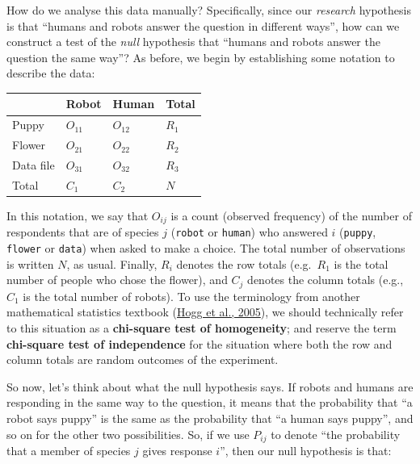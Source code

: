 \documentclass[
]{book}
\theoremstyle{definition}
\theoremstyle{definition}
\theoremstyle{definition}
\theoremstyle{definition}
\theoremstyle{remark}
\begin{document}
How do we analyse this data manually? Specifically, since our \emph{research} hypothesis is that ``humans and robots answer the question in different ways'', how can we construct a test of the \emph{null} hypothesis that ``humans and robots answer the question the same way''? As before, we begin by establishing some notation to describe the data:

\begin{longtable}[]{@{}llll@{}}
\toprule()
& Robot & Human & Total \\
\midrule()
\endhead
Puppy & \(O_{11}\) & \(O_{12}\) & \(R_{1}\) \\
Flower & \(O_{21}\) & \(O_{22}\) & \(R_{2}\) \\
Data file & \(O_{31}\) & \(O_{32}\) & \(R_{3}\) \\
Total & \(C_{1}\) & \(C_{2}\) & \(N\) \\
\bottomrule()
\end{longtable}

In this notation, we say that \(O_{ij}\) is a count (observed frequency) of the number of respondents that are of species \(j\) (\texttt{robot} or \texttt{human}) who answered \(i\) (\texttt{puppy}, \texttt{flower} or \texttt{data}) when asked to make a choice. The total number of observations is written \(N\), as usual. Finally, \(R_i\) denotes the row totals (e.g.~\(R_1\) is the total number of people who chose the flower), and \(C_j\) denotes the column totals (e.g., \(C_1\) is the total number of robots). To use the terminology from another mathematical statistics textbook (\protect\hyperlink{ref-Hogg2005}{Hogg et al., 2005}), we should technically refer to this situation as a \textbf{chi-square test of homogeneity}; and reserve the term \textbf{chi-square test of independence} for the situation where both the row and column totals are random outcomes of the experiment.

So now, let's think about what the null hypothesis says. If robots and humans are responding in the same way to the question, it means that the probability that ``a robot says puppy'' is the same as the probability that ``a human says puppy'', and so on for the other two possibilities. So, if we use \(P_{ij}\) to denote ``the probability that a member of species \(j\) gives response \(i\)'', then our null hypothesis is that:
\end{document}
